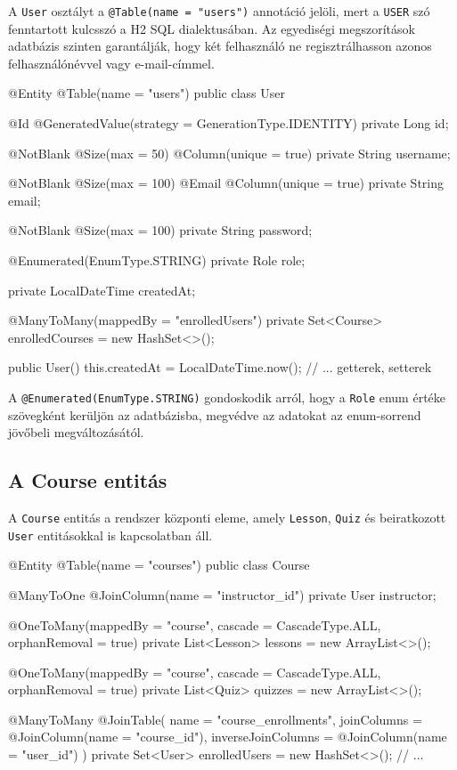 A \texttt{User} osztályt a \texttt{@Table(name = "users")} annotáció jelöli, mert a \texttt{USER} szó fenntartott kulcsszó a H2 SQL dialektusában. Az egyediségi megszorítások adatbázis szinten garantálják, hogy két felhasználó ne regisztrálhasson azonos felhasználónévvel vagy e-mail-címmel.

\begin{java}[caption={A User entitás főbb mezői},label=java:userentity]
@Entity
@Table(name = "users")
public class User {

    @Id
    @GeneratedValue(strategy = GenerationType.IDENTITY)
    private Long id;

    @NotBlank @Size(max = 50)
    @Column(unique = true)
    private String username;

    @NotBlank @Size(max = 100) @Email
    @Column(unique = true)
    private String email;

    @NotBlank @Size(max = 100)
    private String password;

    @Enumerated(EnumType.STRING)
    private Role role;

    private LocalDateTime createdAt;

    @ManyToMany(mappedBy = "enrolledUsers")
    private Set<Course> enrolledCourses = new HashSet<>();

    public User() { this.createdAt = LocalDateTime.now(); }
    // ... getterek, setterek
}
\end{java}

A \texttt{@Enumerated(EnumType.STRING)} gondoskodik arról, hogy a \texttt{Role} enum értéke szövegként kerüljön az adatbázisba, megvédve az adatokat az enum-sorrend jövőbeli megváltozásától.

\subsection{A Course entitás}

A \texttt{Course} entitás a rendszer központi eleme, amely \texttt{Lesson}, \texttt{Quiz} és beiratkozott \texttt{User} entitásokkal is kapcsolatban áll.

\begin{java}[caption={A Course entitás kapcsolatai},label=java:courseentity]
@Entity
@Table(name = "courses")
public class Course {

    @ManyToOne
    @JoinColumn(name = "instructor_id")
    private User instructor;

    @OneToMany(mappedBy = "course",
               cascade = CascadeType.ALL, orphanRemoval = true)
    private List<Lesson> lessons = new ArrayList<>();

    @OneToMany(mappedBy = "course",
               cascade = CascadeType.ALL, orphanRemoval = true)
    private List<Quiz> quizzes = new ArrayList<>();

    @ManyToMany
    @JoinTable(
        name = "course_enrollments",
        joinColumns = @JoinColumn(name = "course_id"),
        inverseJoinColumns = @JoinColumn(name = "user_id")
    )
    private Set<User> enrolledUsers = new HashSet<>();
    // ...
}
\end{java}

